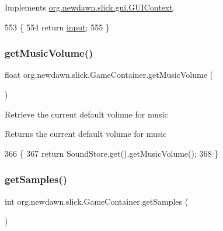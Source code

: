 Implements \mbox{\hyperlink{interfaceorg_1_1newdawn_1_1slick_1_1gui_1_1_g_u_i_context_a716423197d42cf412e98f2650603914f}{org.\+newdawn.\+slick.\+gui.\+G\+U\+I\+Context}}.


\begin{DoxyCode}
553                             \{
554         \textcolor{keywordflow}{return} \mbox{\hyperlink{classorg_1_1newdawn_1_1slick_1_1_game_container_a2902f3d98d24fc41fc32d591f39eb587}{input}};
555     \}
\end{DoxyCode}
\mbox{\label{classorg_1_1newdawn_1_1slick_1_1_game_container_a5cd19514224150f80b8dcec55c382d18}} 
\subsubsection{\texorpdfstring{get\+Music\+Volume()}{getMusicVolume()}}
{\footnotesize\ttfamily float org.\+newdawn.\+slick.\+Game\+Container.\+get\+Music\+Volume (\begin{DoxyParamCaption}{ }\end{DoxyParamCaption})\hspace{0.3cm}{\ttfamily [inline]}}

Retrieve the current default volume for music \begin{DoxyReturn}{Returns}
the current default volume for music 
\end{DoxyReturn}

\begin{DoxyCode}
366                                   \{
367         \textcolor{keywordflow}{return} SoundStore.get().getMusicVolume();
368     \}
\end{DoxyCode}
\mbox{\label{classorg_1_1newdawn_1_1slick_1_1_game_container_a70164ae56bf8a12fdd9108c9d9683185}} 
\subsubsection{\texorpdfstring{get\+Samples()}{getSamples()}}
{\footnotesize\ttfamily int org.\+newdawn.\+slick.\+Game\+Container.\+get\+Samples (\begin{DoxyParamCaption}{ }\end{DoxyParamCaption})\hspace{0.3cm}{\ttfamily [inline]}}

